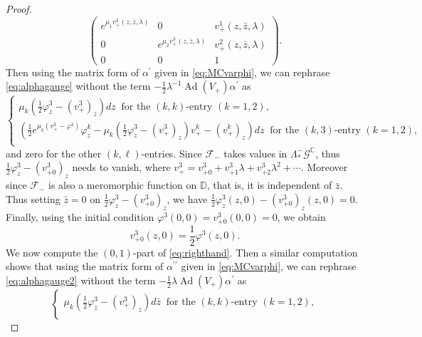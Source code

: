 \documentclass[12pt]{amsart}
\theoremstyle{definition}
\theoremstyle{remark}
\numberwithin{equation}{section}
\begin{document}
\begin{proof}
\begin{equation*}
\begin{pmatrix}
  e^{\mu_1 v^3_+(z, \bar z, {\lambda})} & 0 &v^1_+(z, \bar z, {\lambda}) \\
  0 & e^{\mu_2 v^3_+(z, \bar z, {\lambda})} & v^2_+(z, \bar z, {\lambda})\\
  0 & 0 &1
 \end{pmatrix}.
\end{equation*}
 Then using the matrix form of $\alpha^{\prime}$ given in \eqref{eq:MCvarphi}, 
 we can rephrase \eqref{eq:alphagauge} without 
 the term $-\frac{1}{2}{\lambda}^{-1}{\operatorname{Ad}} (V_+) \alpha^{\prime}$  as
\begin{equation*}
\left\{
 \begin{array}{l}
 \mu_k(\frac{1}{2} \varphi^3_z - (v^3_+)_z) dz \;\;\mbox{for the $(k, k)$-entry $(k=1, 2)$}, \\[0.1cm]
 \left(\frac{1}{2}e^{\mu_k(v^3_+ -\varphi^3)} \varphi^k_z
 -\mu_k(\frac{1}{2} \varphi^3_z - (v^3_+)_z) v^k_+  -  (v^k_+)_z\right) dz
 \;\;\mbox{for the $(k, 3)$-entry $(k=1, 2)$}, \\
 \end{array}
\right.
\end{equation*}
 and zero for the other $(k, \ell)$-entries.
 Since ${\mathcal F}_-$ takes values in ${\Lambda^{-}_{*} {\mathcal G}^{\mathbb C}}$, thus $\frac{1}{2} \varphi^3_z - (v^3_{+0})_z$
 needs to vanish,  where $v^3_+ = v^3_{+0} + v^3_{+1} {\lambda} +  v^3_{+2}{\lambda}^2 + \cdots$.
 Moreover since ${\mathcal F}_-$ is also a meromorphic function on ${\mathbb D}$, that is, 
 it is independent of 
 $\bar z$. Thus setting $\bar z =0$ on $\frac{1}{2} \varphi^3_z - (v^3_{+0})_z$, we have 
 $\frac{1}{2} \varphi^3_z(z, 0) - (v^3_{+0})_z(z, 0) =0$.
 Finally, using the initial condition $\varphi^{3}(0, 0) = v^3_{+0}(0, 0) =0$, we obtain 
\begin{equation}\label{eq:Cauchydata}
 v^3_{+0}(z, 0) = \frac{1}{2} \varphi^3(z, 0).
\end{equation}
 We now compute the $(0, 1)$-part of \eqref{eq:righthand}.
 Then a similar computation shows that 
 using the matrix form of $\alpha^{\prime \prime}$ given in \eqref{eq:MCvarphi}, 
 we can rephrase  \eqref{eq:alphagauge2} without 
 the term $-\frac{1}{2} {\lambda}{\operatorname{Ad}} (V_+) \alpha^{\prime}$  as
\begin{equation}\label{eq:antialphamatrix}
\left\{
 \begin{array}{l}
 \mu_k(\frac{1}{2} \varphi^3_{\bar z} - (v^3_+)_{\bar z}) d\bar z 
  \;\;\mbox{for the $(k, k)$-entry $(k=1, 2)$}, \\[0.1cm]

\end{array}
\end{equation}
\end{proof}
\end{document}
